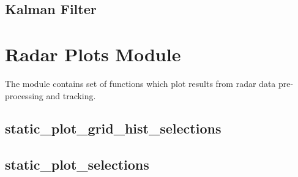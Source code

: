 \documentclass[letterpaper,10pt,english]{Reference manual}
\begin{document}
\section{Kalman Filter}
\label{\detokenize{trackingfilters:kalman-filter}}

\begin{fulllineitems}
\label{\detokenize{trackingfilters:tracking_filters.KalmanFilter}}
\end{fulllineitems}



\chapter{Radar Plots Module}
\label{\detokenize{radarplots:radar-plots-module}}\label{\detokenize{radarplots::doc}}
The module contains set of functions which plot results from radar data pre-processing and tracking.
\label{\detokenize{radarplots:module-radar_plots}}

\section{static\_plot\_grid\_hist\_selections}
\label{\detokenize{radarplots:static-plot-grid-hist-selections}}

\begin{fulllineitems}
\label{\detokenize{radarplots:radar_plots.static_plot_grid_hist_selections}}
\end{fulllineitems}



\section{static\_plot\_selections}
\label{\detokenize{radarplots:static-plot-selections}}

\begin{fulllineitems}
\label{\detokenize{radarplots:radar_plots.static_plot_selections}}
\end{fulllineitems}
\end{document}
